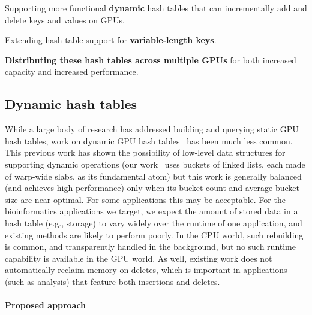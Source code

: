 
\begin{rproblem}
  Supporting more functional \textbf{dynamic} hash tables that can incrementally add and delete keys and values on GPUs.
  \label{rprob:dynamic-gpu-hashtable}
\end{rproblem}

\begin{rproblem}
  Extending hash-table support for \textbf{variable-length keys}.
  \label{rprob:variable-hashtable}
\end{rproblem}

\begin{rproblem}
  \textbf{Distributing these hash tables across multiple GPUs} for both increased capacity and increased performance.
  \label{rprob:dist-hashtable}
\end{rproblem}

\subsection{Dynamic hash tables}

While a large body of research has addressed building and querying static GPU hash tables, work on dynamic GPU hash tables~\cite{Ashkiani:2018:ADH,Junger:2020:WAL,Li:2021:DDH,Zhou:2021:DAD} has been much less common. This previous work has shown the possibility of low-level data structures for supporting dynamic operations (our work~\cite{Ashkiani:2018:ADH} uses buckets of linked lists, each made of warp-wide slabs, as its fundamental atom) but this work is generally balanced (and achieves high performance) only when its bucket count and average bucket size are near-optimal. For some applications this may be acceptable. For the bioinformatics applications we target, we expect the amount of stored data in a hash table (e.g., \kmer storage) to vary widely over the runtime of one application, and existing methods are likely to perform poorly. In the CPU world, such rebuilding is common, and transparently handled in the background, but no such runtime capability is available in the GPU world. As well, existing work does not automatically reclaim memory on deletes, which is important in applications (such as \kmer analysis) that feature both insertions and deletes.

\paragraph{Proposed approach}

